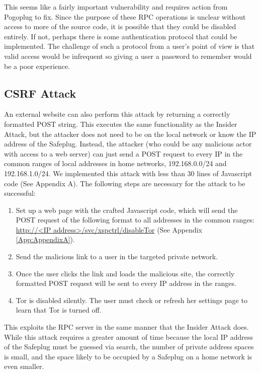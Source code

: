 This seems like a fairly important vulnerability and requires action from Pogoplug to fix.  Since the purpose of these RPC operations is unclear without access to more of the source code, it is possible that they could be disabled entirely.  If not, perhaps there is some authentication protocol that could be implemented.  The challenge of such a protocol from a user's point of view is that valid access would be infrequent so giving a user a password to remember would be a poor experience.

\subsection{CSRF Attack}
An external website can also perform this attack by returning a correctly formatted POST string.  This executes the same functionality as the Insider Attack, but the attacker does not need to be on the local network or know the IP address of the Safeplug.  Instead, the attacker (who could be any malicious actor with access to a web server) can just send a POST request to every IP in the common ranges of local addresses in home networks, 192.168.0.0/24 and 192.168.1.0/24.  We implemented this attack with less than 30 lines of Javascript code (See Appendix A).  The following steps are necessary for the attack to be successful:

\begin{enumerate}
\item Set up a web page with the crafted Javascript code, which will send the POST request of the following format to all addresses in the common ranges: \url{http://<IP address>/svc/xspctrl/disableTor} (See Appendix \ref{App:AppendixA}).
\item Send the malicious link to a user in the targeted private network.
\item Once the user clicks the link and loads the malicious site, the correctly formatted POST request will be sent to every IP address in the ranges.  
\item Tor is disabled silently.  The user must check or refresh her settings page to learn that Tor is turned off.  
\end{enumerate}  

This exploits the RPC server in the same manner that the Insider Attack does.  While this attack requires a greater amount of time because the local IP address of the Safeplug must be guessed via search, the number of private address spaces is small, and the space likely to be occupied by a Safeplug on a home network is even smaller.  

